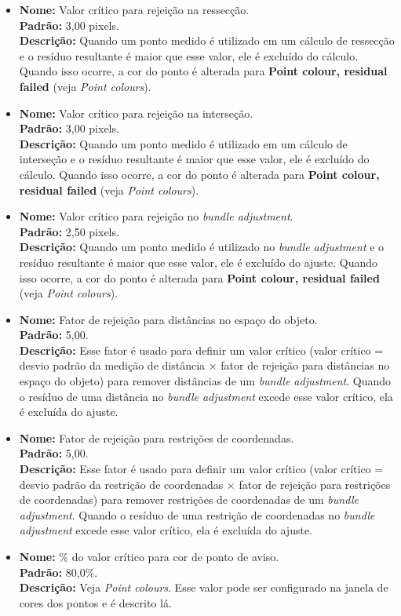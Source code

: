 \documentclass[
  12pt,
  letterpaper,
  DIV=11,
  numbers=noendperiod]{scrreprt}
\begin{document}
\begin{itemize}
\item
  \textbf{Nome:} Valor crítico para rejeição na ressecção.\\
  \textbf{Padrão:} 3,00 pixels.\\
  \textbf{Descrição:} Quando um ponto medido é utilizado em um cálculo
  de ressecção e o resíduo resultante é maior que esse valor, ele é
  excluído do cálculo. Quando isso ocorre, a cor do ponto é alterada
  para \textbf{Point colour, residual failed} (veja \emph{Point
  colours}).
\item
  \textbf{Nome:} Valor crítico para rejeição na interseção.\\
  \textbf{Padrão:} 3,00 pixels.\\
  \textbf{Descrição:} Quando um ponto medido é utilizado em um cálculo
  de interseção e o resíduo resultante é maior que esse valor, ele é
  excluído do cálculo. Quando isso ocorre, a cor do ponto é alterada
  para \textbf{Point colour, residual failed} (veja \emph{Point
  colours}).
\item
  \textbf{Nome:} Valor crítico para rejeição no \emph{bundle
  adjustment}.\\
  \textbf{Padrão:} 2,50 pixels.\\
  \textbf{Descrição:} Quando um ponto medido é utilizado no \emph{bundle
  adjustment} e o resíduo resultante é maior que esse valor, ele é
  excluído do ajuste. Quando isso ocorre, a cor do ponto é alterada para
  \textbf{Point colour, residual failed} (veja \emph{Point colours}).
\item
  \textbf{Nome:} Fator de rejeição para distâncias no espaço do
  objeto.\\
  \textbf{Padrão:} 5,00.\\
  \textbf{Descrição:} Esse fator é usado para definir um valor crítico
  (valor crítico = desvio padrão da medição de distância × fator de
  rejeição para distâncias no espaço do objeto) para remover distâncias
  de um \emph{bundle adjustment}. Quando o resíduo de uma distância no
  \emph{bundle adjustment} excede esse valor crítico, ela é excluída do
  ajuste.
\item
  \textbf{Nome:} Fator de rejeição para restrições de coordenadas.\\
  \textbf{Padrão:} 5,00.\\
  \textbf{Descrição:} Esse fator é usado para definir um valor crítico
  (valor crítico = desvio padrão da restrição de coordenadas × fator de
  rejeição para restrições de coordenadas) para remover restrições de
  coordenadas de um \emph{bundle adjustment}. Quando o resíduo de uma
  restrição de coordenadas no \emph{bundle adjustment} excede esse valor
  crítico, ela é excluída do ajuste.
\item
  \textbf{Nome:} \% do valor crítico para cor de ponto de aviso.\\
  \textbf{Padrão:} 80,0\%.\\
  \textbf{Descrição:} Veja \emph{Point colours}. Esse valor pode ser
  configurado na janela de cores dos pontos e é descrito lá.
\end{itemize}
\end{document}
